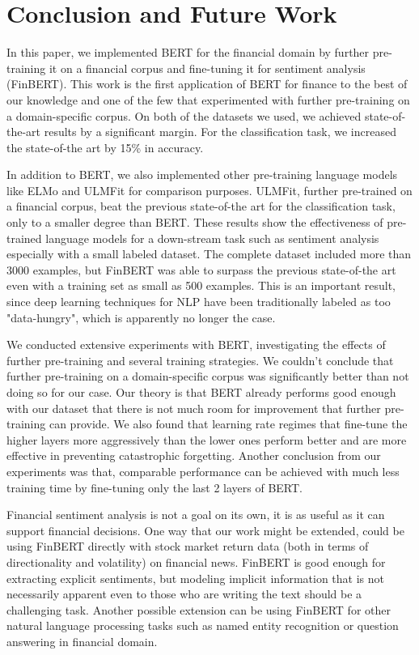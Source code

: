 \documentclass[../main.tex]{subfiles}
\begin{document}
\section{Conclusion and Future Work} \label{conclusion}

In this paper, we implemented BERT for the financial domain by further pre-training it on a financial corpus and fine-tuning it for sentiment analysis (FinBERT). This work is the first application of BERT for finance to the best of our knowledge and one of the few that experimented with further pre-training on a domain-specific corpus. On both of the datasets we used, we achieved state-of-the-art results by a significant margin. For the classification task, we increased the state-of-the art by 15\% in accuracy.

In addition to BERT, we also implemented other pre-training language models like ELMo and ULMFit for comparison purposes. ULMFit, further pre-trained on a financial corpus, beat the previous state-of-the art for the classification task, only to a smaller degree than BERT. These results show the effectiveness of pre-trained language models for a down-stream task such as sentiment analysis especially with a small labeled dataset. The complete dataset included more than 3000 examples, but FinBERT was able to surpass the previous state-of-the art even with a training set as small as 500 examples. This is an important result, since deep learning techniques for NLP have been traditionally labeled as too "data-hungry", which is apparently no longer the case.

We conducted extensive experiments with BERT, investigating the effects of further pre-training and several training strategies. We couldn't conclude that further pre-training on a domain-specific corpus was significantly better than not doing so for our case. Our theory is that BERT already performs good enough with our dataset that there is not much room for improvement that further pre-training can provide. We also found that learning rate regimes that fine-tune the higher layers more aggressively than the lower ones perform better and are more effective in preventing catastrophic forgetting. Another conclusion from our experiments was that, comparable performance can be achieved with much less training time by fine-tuning only the last 2 layers of BERT. 

Financial sentiment analysis is not a goal on its own, it is as useful as it can support financial decisions. One way that our work might be extended, could be using FinBERT directly with stock market return data (both in terms of directionality and volatility) on financial news. FinBERT is good enough for extracting explicit sentiments, but modeling implicit information that is not necessarily apparent even to those who are writing the text should be a challenging task. Another possible extension can be using FinBERT for other natural language processing tasks such as named entity recognition or question answering in financial domain. 
\end{document}
